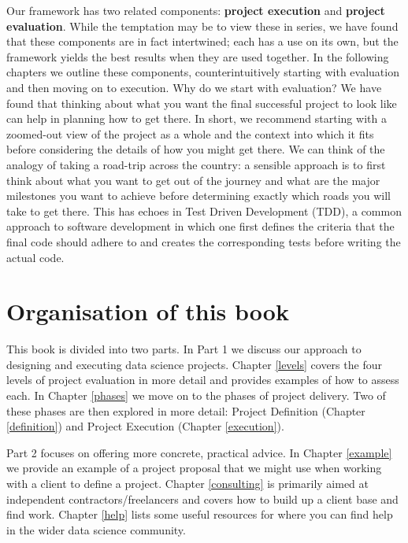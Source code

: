 \documentclass[
]{book}
\begin{document}
Our framework has two related components: \textbf{project execution} and \textbf{project evaluation}. While the temptation may be to view these in series, we have found that these components are in fact intertwined; each has a use on its own, but the framework yields the best results when they are used together. In the following chapters we outline these components, counterintuitively starting with evaluation and then moving on to execution. Why do we start with evaluation? We have found that thinking about what you want the final successful project to look like can help in planning how to get there. In short, we recommend starting with a zoomed-out view of the project as a whole and the context into which it fits before considering the details of how you might get there. We can think of the analogy of taking a road-trip across the country: a sensible approach is to first think about what you want to get out of the journey and what are the major milestones you want to achieve before determining exactly which roads you will take to get there. This has echoes in Test Driven Development (TDD), a common approach to software development in which one first defines the criteria that the final code should adhere to and creates the corresponding tests before writing the actual code.

\hypertarget{organisation-of-this-book}{%
\section{Organisation of this book}\label{organisation-of-this-book}}

This book is divided into two parts. In Part 1 we discuss our approach to designing and executing data science projects. Chapter \ref{levels} covers the four levels of project evaluation in more detail and provides examples of how to assess each. In Chapter \ref{phases} we move on to the phases of project delivery. Two of these phases are then explored in more detail: Project Definition (Chapter \ref{definition}) and Project Execution (Chapter \ref{execution}).

Part 2 focuses on offering more concrete, practical advice. In Chapter \ref{example} we provide an example of a project proposal that we might use when working with a client to define a project. Chapter \ref{consulting} is primarily aimed at independent contractors/freelancers and covers how to build up a client base and find work. Chapter \ref{help} lists some useful resources for where you can find help in the wider data science community.
\end{document}
